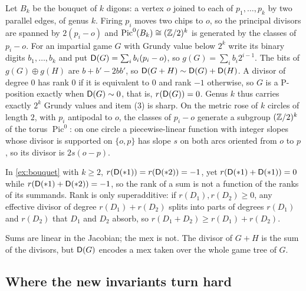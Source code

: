 \begin{example}\label{ex:bouquet}
Let $B_k$ be the bouquet of $k$ digons: a vertex $o$ joined to each of $p_1,\dots,p_k$ by two parallel edges, of genus $k$. Firing $p_i$ moves two chips to $o$, so the principal divisors are spanned by $2(p_i-o)$ and $\operatorname{Pic}^0(B_k)\cong(\mathbb{Z}/2)^k$ is generated by the classes of $p_i-o$. For an impartial game $G$ with Grundy value below $2^k$ write its binary digits $b_1,\dots,b_k$ and put $\mathsf{D}(G)=\sum_ib_i(p_i-o)$, so $g(G)=\sum_ib_i2^{i-1}$. The bits of $g(G)\oplus g(H)$ are $b+b'-2bb'$, so $\mathsf{D}(G+H)\sim\mathsf{D}(G)+\mathsf{D}(H)$. A divisor of degree $0$ has rank $0$ if it is equivalent to $0$ and rank $-1$ otherwise, so $G$ is a P-position exactly when $\mathsf{D}(G)\sim0$, that is, $r(\mathsf{D}(G))=0$. Genus $k$ thus carries exactly $2^k$ Grundy values and item (3) is sharp. On the metric rose of $k$ circles of length $2$, with $p_i$ antipodal to $o$, the classes of $p_i-o$ generate a subgroup $(\mathbb{Z}/2)^k$ of the torus $\operatorname{Pic}^0$: on one circle a piecewise-linear function with integer slopes whose divisor is supported on $\{o,p\}$ has slope $s$ on both arcs oriented from $o$ to $p$, so its divisor is $2s(o-p)$.
\end{example}

\begin{corollary}\label{cor:rank-not}
In \cref{ex:bouquet} with $k\ge2$, $r(\mathsf{D}(*1))=r(\mathsf{D}(*2))=-1$, yet $r(\mathsf{D}(*1)+\mathsf{D}(*1))=0$ while $r(\mathsf{D}(*1)+\mathsf{D}(*2))=-1$, so the rank of a sum is not a function of the ranks of its summands. Rank is only superadditive: if $r(D_1),r(D_2)\ge0$, any effective divisor of degree $r(D_1)+r(D_2)$ splits into parts of degrees $r(D_1)$ and $r(D_2)$ that $D_1$ and $D_2$ absorb, so $r(D_1+D_2)\ge r(D_1)+r(D_2)$.
\end{corollary}

Sums are linear in the Jacobian; the mex is not. The divisor of $G+H$ is the sum of the divisors, but $\mathsf{D}(G)$ encodes a mex taken over the whole game tree of $G$.

\subsection{Where the new invariants turn hard}\label{ssec:hard}

